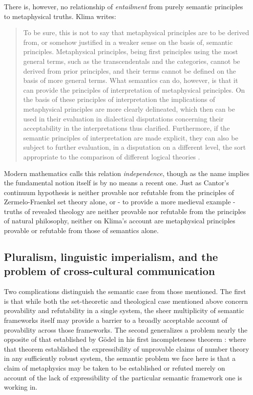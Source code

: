 \documentclass[]{article}
\begin{document}
There is, however, no relationship of \emph{entailment} from purely semantic principles to metaphysical truths. Klima writes: 
\begin{quote}
To be sure, this is not to say that metaphysical principles are to be derived from, or somehow justified 
in a weaker sense on the basis of, semantic principles. Metaphysical principles, being first principles 
using the most general terms, such as the transcendentals and the categories, cannot be derived from 
prior principles, and their terms cannot be defined on the basis of more general terms. What 
semantics can do, however, is that it can provide the principles of interpretation of metaphysical 
principles. On the basis of these principles of interpretation the implications of metaphysical 
principles are more clearly delineated, which then can be used in their evaluation in dialectical 
disputations concerning their acceptability in the interpretations thus clarified. Furthermore, if the 
semantic principles of interpretation are made explicit, they can also be subject to further evaluation, 
in a disputation on a different level, the sort appropriate to the comparison of different logical 
theories  \autocite[49]{Klima2011b}.
\end{quote}
Modern mathematics calls this relation \emph{independence}, 
though as the name implies the fundamental notion itself is by no means a recent one. 
Just as Cantor's continuum hypothesis is neither provable nor refutable from the principles of Zermelo-Fraenkel set theory alone, 
or - to provide a more medieval example - 
truths of revealed theology are neither provable nor refutable from the principles of natural philosophy, 
neither on Klima's account are metaphysical principles provable or refutable from those of semantics alone. 

\subsection{Pluralism, linguistic imperialism, and the problem of cross-cultural communication}
Two complications distinguish the semantic case from those mentioned. 
The first is that while both the set-theoretic and theological case mentioned above concern provability and refutability in a single system, 
the sheer multiplicity of semantic frameworks itself may provide a barrier to a broadly acceptable account of provability across those frameworks. 
The second generalizes a problem nearly the opposite of that established by G\"{o}del in his first incompleteness theorem \autocite{Godel1931}: 
where that theorem established the expressibility of unprovable claims of number theory in any sufficiently robust system, 
the semantic problem we face here is that a claim of metaphysics may be taken to be established or refuted merely on account of the lack of expressibility of the particular semantic framework one is working in. 
\end{document}
